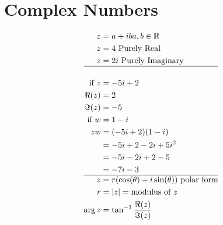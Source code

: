 \section{Complex Numbers}
\begin{align}
z &= a+ib \hfill a,b \in \mathbb{R}\\
z&=4 \text{ Purely Real}\\
z&=2i \text{ Purely Imaginary}\\
\hline\\
\text{if } z &= -5i+2\\
\Re(z) &= 2\\
\Im(z) &= -5\\
\text{if } w &= 1-i\\
zw &= (-5i+2)(1-i)\\
&= -5i+2-2i+5i^2\\
&= -5i-2i+2-5\\
&= -7i-3\\
\hline
z&= r(\cos(\theta) + i \sin(\theta)) \text{ polar form}\\
r&= |z| = \text{modulus of }z\\
\arg{z} &= \tan^{-1}{\frac{\Re(z)}{\Im(z)}}
\end{align}